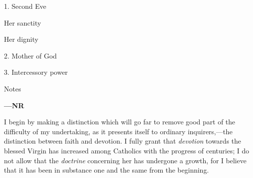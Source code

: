 
1. Second Eve

Her sanctity

Her dignity

2. Mother of God

3. Intercessory power

Notes

\textbf{—NR}

I begin by making a distinction which will go far to remove good
part of the difficulty of my undertaking, as it presents itself to
ordinary inquirers,—the distinction between faith and devotion. I
fully grant that \emph{devotion} towards the blessed Virgin has
increased among Catholics with the progress of centuries; I do not allow
that the \emph{doctrine} concerning her has undergone a growth, for I
believe that it has been in substance one and the same from the
beginning.


